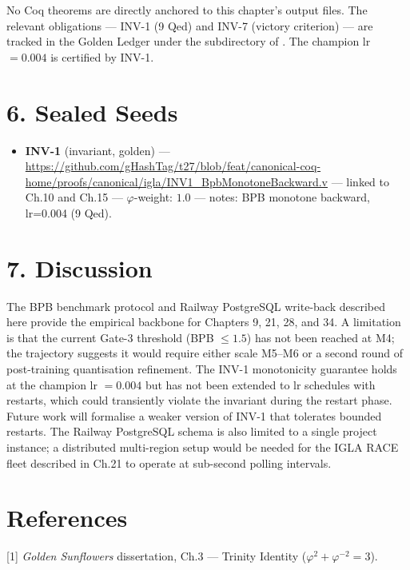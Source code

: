 No Coq theorems are directly anchored to this
chapter's output files. The relevant obligations
--- INV-1 (9 Qed) and INV-7 (victory criterion)
--- are tracked in the Golden Ledger under the
 subdirectory of
. The champion lr
\(= 0.004\) is certified by INV-1.

\section{6. Sealed Seeds}\label{fa_15:sealed-seeds}

\begin{itemize}
\tightlist
\item
  \textbf{INV-1} (invariant, golden) ---
  \url{https://github.com/gHashTag/t27/blob/feat/canonical-coq-home/proofs/canonical/igla/INV1\_BpbMonotoneBackward.v}
  --- linked to Ch.10 and Ch.15 ---
  \(\varphi\)-weight: \(1.0\) --- notes: BPB
  monotone backward, lr=0.004 (9 Qed).
\end{itemize}

\section{7. Discussion}\label{fa_15:discussion}

The BPB benchmark protocol and Railway PostgreSQL write-back
described here provide the empirical backbone for
Chapters 9, 21, 28, and 34. A limitation is that
the current Gate-3 threshold (BPB \(\leq 1.5\))
has not been reached at M4; the trajectory
suggests it would require either scale M5--M6 or a
second round of post-training quantisation
refinement. The INV-1 monotonicity guarantee holds
at the champion lr \(= 0.004\) but has not been
extended to lr schedules with restarts, which
could transiently violate the invariant during the
restart phase. Future work will formalise a weaker
version of INV-1 that tolerates bounded restarts.
The Railway PostgreSQL schema is also limited to a single
project instance; a distributed multi-region setup
would be needed for the IGLA RACE fleet described
in Ch.21 to operate at sub-second polling
intervals.

\section{References}\label{fa_15:references}

[1] \emph{Golden Sunflowers} dissertation,
Ch.3 --- Trinity Identity
(\(\varphi^2 + \varphi^{-2} = 3\)).

